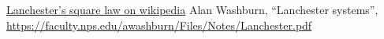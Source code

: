 \documentclass{article}
\begin{document}
\begin{thebibliography}{1}
    \href{https://en.wikipedia.org/wiki/Lanchester's_laws}
         {Lanchester's square law on wikipedia}
    Alan Washburn,
    ``Lanchester systems'',
    \url{https://faculty.nps.edu/awashburn/Files/Notes/Lanchester.pdf}
\end{thebibliography}

\end{document}
